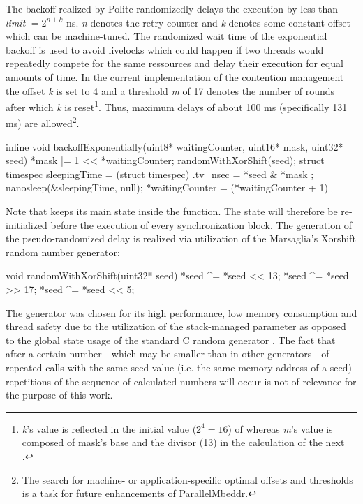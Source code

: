 The backoff realized by Polite randomizedly delays the execution  by less than \textit{limit} $ = 2^{n+k}$ ns\cite{AdvancedContentionManagement}. \textit{n} denotes the retry counter and \textit{k} denotes some constant offset which can be machine-tuned. The randomized wait time of the exponential backoff is used to avoid livelocks which could happen if two threads would repeatedly compete for the same ressources and delay their execution for equal amounts of time. In the current implementation  of the contention management the offset \textit{k} is set to 4 and a threshold \textit{m} of 17 denotes the number of rounds after which \textit{k} is reset\footnote{\textit{k}'s value is reflected in the initial value ($2^4 = 16$) of  whereas \textit{m}'s value is composed of mask's base and the divisor (13) in the calculation of the next .}. Thus, maximum delays of about 100 ms (specifically 131 ms) are allowed\footnote{The search for machine- or application-specific optimal offsets and thresholds is a task for future enhancements of ParallelMbeddr.}. 
\begin{ccode}
inline void backoffExponentially(uint8* waitingCounter, uint16* mask, uint32* seed) { 
  *mask |= 1 << *waitingCounter; 
  randomWithXorShift(seed); 
  struct timespec sleepingTime = (struct timespec){ .tv_nsec = *seed & *mask }; 
  nanosleep(&sleepingTime, null); 
  *waitingCounter = (*waitingCounter + 1) %
}
\end{ccode}
Note that  keeps its main state inside the  function. The state will therefore be re-initialized before the execution of every synchronization block. The generation of the pseudo-randomized delay is realized via utilization of the Marsaglia's Xorshift random number generator\cite{XorshiftRngs}:
\begin{ccode}
void randomWithXorShift(uint32* seed) { 
  *seed ^= *seed << 13; 
  *seed ^= *seed >> 17; 
  *seed ^= *seed << 5; 
}
\end{ccode}
The generator was chosen for its high performance, low memory consumption and thread safety due to the utilization of the stack-managed  parameter as opposed to the global state usage of the standard C random generator . The fact that after a certain number---which may be smaller than in other generators---of repeated calls with the same seed value (i.e. the same memory address of a seed) repetitions of the sequence of calculated numbers will occur is not of relevance for the purpose of this work.

